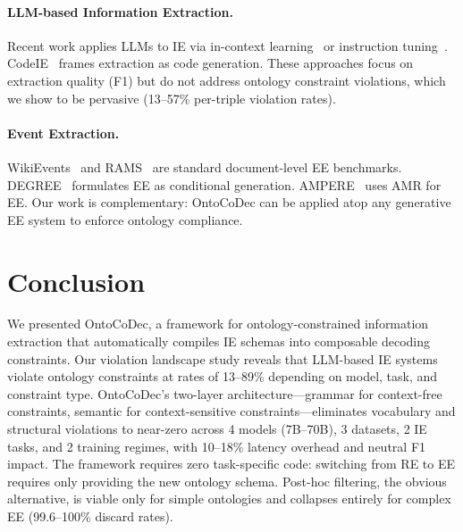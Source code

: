\documentclass[11pt]{article}
\newcommand{\sys}{OntoCoDec}
\begin{document}
\paragraph{LLM-based Information Extraction.}
Recent work applies LLMs to IE via in-context learning~\cite{wadhwa2023revisiting,xu2023large} or instruction tuning~\cite{wang2023instructuie,lu2024pivoine}.
CodeIE~\cite{li2023codeie} frames extraction as code generation.
These approaches focus on extraction quality (F1) but do not address ontology constraint violations, which we show to be pervasive (13--57\% per-triple violation rates).

\paragraph{Event Extraction.}
WikiEvents~\cite{li2021document} and RAMS~\cite{ebner2020multi} are standard document-level EE benchmarks.
DEGREE~\cite{hsu2022degree} formulates EE as conditional generation.
AMPERE~\cite{hsu2023ampere} uses AMR for EE.
Our work is complementary: \sys{} can be applied atop any generative EE system to enforce ontology compliance.

\section{Conclusion}
\label{sec:conclusion}

We presented \sys{}, a framework for ontology-constrained information extraction that automatically compiles IE schemas into composable decoding constraints.
Our violation landscape study reveals that LLM-based IE systems violate ontology constraints at rates of 13--89\% depending on model, task, and constraint type.
\sys{}'s two-layer architecture---grammar for context-free constraints, semantic for context-sensitive constraints---eliminates vocabulary and structural violations to near-zero across 4 models (7B--70B), 3 datasets, 2 IE tasks, and 2 training regimes, with 10--18\% latency overhead and neutral F1 impact.
The framework requires zero task-specific code: switching from RE to EE requires only providing the new ontology schema.
Post-hoc filtering, the obvious alternative, is viable only for simple ontologies and collapses entirely for complex EE (99.6--100\% discard rates).

\end{document}
